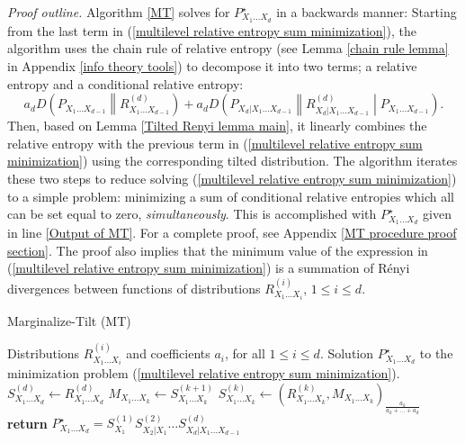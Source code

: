 \documentclass{article}
\begin{document}
{\it Proof outline.}
Algorithm \ref{MT} solves for $P^{\star}_{X_1\dots X_d}$ in a backwards manner: Starting from the last term in (\ref{multilevel relative entropy sum minimization}), the algorithm uses the chain rule of relative entropy (see Lemma \ref{chain rule lemma} in Appendix \ref{info theory tools}) to decompose it into two terms; a relative entropy and a conditional relative entropy:
\begin{equation}
    a_d D\left(P_{X_1\dots X_{d-1}}\middle\|R^{(d)}_{X_1\dots X_{d-1}}\right)+a_d D\left(P_{X_d|X_1\dots X_{d-1}}\middle\|R^{(d)}_{X_d|X_1\dots X_{d-1}}\middle|P_{X_1\dots X_{d-1}}\right).\nonumber
\end{equation}
Then, based on Lemma \ref{Tilted Renyi lemma main}, it linearly combines the relative entropy with the previous term in (\ref{multilevel relative entropy sum minimization}) using the corresponding tilted distribution. The algorithm iterates these two steps to reduce solving (\ref{multilevel relative entropy sum minimization}) to a simple problem: minimizing a sum of conditional relative entropies which all can be set equal to zero, \emph{simultaneously}. This is accomplished with $P^{\star}_{X_1\dots X_d}$ given in line \ref{Output of MT}. For a complete proof, see Appendix \ref{MT procedure proof section}. The proof 
also implies that the minimum value of the expression in (\ref{multilevel relative entropy sum minimization}) is a summation of R\'{e}nyi divergences between functions of distributions 
$R^{(i)}_{X_1\dots X_i}$, $1\leq i\leq d$. 
\begin{algorithm}
    \caption{Marginalize-Tilt (MT)}
    \label{MT}
    \begin{algorithmic}[1]      
    \Require Distributions $R^{(i)}_{X_1\dots X_i}$ and coefficients $a_i$, for all $1\leq i \leq d$.
	\Ensure Solution $P^{\star}_{X_1\dots X_d}$ to the minimization problem (\ref{multilevel relative entropy sum minimization}).
                 \State $S^{(d)}_{X_1\dots X_d}\gets R^{(d)}_{X_1\dots X_d}$
        	 	 \State $M_{X_1\dots X_{k}}\gets S^{(k+1)}_{X_1\dots X_{k}}$ 
        	 	 \State $S^{(k)}_{X_1\dots X_{k}}\gets \left(R_{X_1\dots X_{k}}^{(k)},M_{X_1\dots X_{k}}\right)_{\frac{a_{k}}{a_{k}+\dots +a_d}}$ 
     			 \EndFor
            \State \textbf{return} $P^{\star}_{X_1\dots X_d}= S^{(1)}_{X_1}S^{(2)}_{X_2|X_1}\dots S^{(d)}_{X_d|X_1\dots X_{d-1}}$\label{Output of MT}
    \end{algorithmic}
\end{algorithm}
\end{document}
